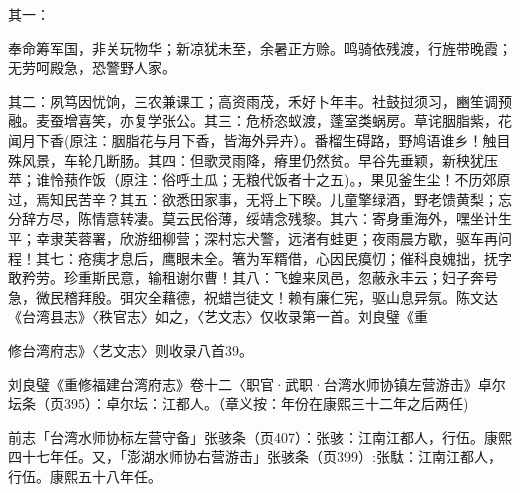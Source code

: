 其一：

\begin{BookQuote}
奉命筹军国，非关玩物华；新凉犹未至，余暑正方赊。鸣骑依残渡，行旌带晚霞；无劳呵殿急，恐警野人家。
\end{BookQuote}

\vfill
\begin{BookNotes}
\end{BookNotes}

\noindent 其二：夙笃因忧饷，三农兼课工；高资雨茂，禾好卜年丰。社鼓挝须习，豳笙调预融。麦蚕增喜笑，亦复学张公。其三：危桥恣蚁渡，蓬室类蜗房。草诧胭脂紫，花闻月下香(原注：胭脂花与月下香，皆海外异卉）。番榴生碍路，野鸠语谁乡！触目殊风景，车轮几断肠。其四：但歌灵雨降，瘠里仍然贫。早谷先垂颖，新秧犹压苹；谁怜蓣作饭（原注：俗呼土瓜；无粮代饭者十之五)。，果见釜生尘！不历郊原过，焉知民苦辛？其五：欲悉田家事，无将上下睽。儿童擎绿酒，野老馈黄梨；忘分辞方尽，陈情意转凄。莫云民俗薄，绥靖念残黎。其六：寄身重海外，嘿坐计生平；幸隶芙蓉署，欣游细柳营；深村忘犬警，远渚有蛙更；夜雨晨方歇，驱车再问程！其七：疮痍才息后，鹰眼未全。箸为军糈借，心因民瘼忉；催科良媿拙，抚字敢矜劳。珍重斯民意，输租谢尔曹！其八：飞蝗来凤邑，忽蔽永丰云；妇子奔号急，微民稽拜殷。弭灾全藉德，祝蜡岂徒文！赖有廉仁宪，驱山息异氛。陈文达《台湾县志》〈秩官志〉如之，〈艺文志〉仅收录第一首。刘良璧《重


\noindent 修台湾府志》〈艺文志〉则收录八首39。


\noindent 刘良璧《重修福建台湾府志》卷十二〈职官·武职·台湾水师协镇左营游击》卓尔坛条（页395）：卓尔坛：江都人。（章义按：年份在康熙三十二年之后两任)


\noindent 前志「台湾水师协标左营守备」张骇条（页407）：张骇：江南江都人，行伍。康熙四十七年任。又，「澎湖水师协右营游击」张骇条（页399）:张駄：江南江都人，行伍。康熙五十八年任。


